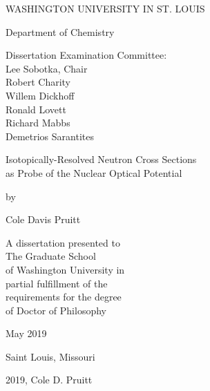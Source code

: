 \begin{titlepage}
    \begin{singlespace}
        \begin{center}
            \vspace*{1cm}

            WASHINGTON UNIVERSITY IN ST. LOUIS

            \vspace{0.5cm}
            Department of Chemistry

            \vspace{1.5cm}

            Dissertation Examination Committee:\\
            Lee Sobotka, Chair\\
            Robert Charity\\
            Willem Dickhoff\\ 
            Ronald Lovett\\
            Richard Mabbs\\
            Demetrios Sarantites\\

            \vspace{1.5 cm}

            Isotopically-Resolved Neutron Cross Sections\\
            as Probe of the Nuclear Optical Potential

            \vspace{0.5 cm}

            by

            \vspace{0.5 cm}

            Cole Davis Pruitt

            \vfill

            A dissertation presented to\\
            The Graduate School\\
            of Washington University in\\
            partial fulfillment of the\\
            requirements for the degree\\
            of Doctor of Philosophy

            \vspace{0.8cm}

            May 2019

            \vspace{0.5 cm}
            Saint Louis, Missouri

        \end{center}
    \end{singlespace}
\end{titlepage}

\vspace*{\fill}
\begin{center}    
    \textcopyright \hspace{2pt} 2019, Cole D. Pruitt
\end{center}
\vspace*{\fill}
\thispagestyle{empty} %

\setcounter{page}{1}
